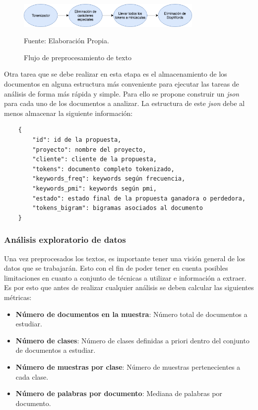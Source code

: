     \begin{figure}[H]
    \centering
    \includegraphics[width=0.8\textwidth]{figures/Normalizador_Textos.png}
    \caption{\label{fig:normalizador} Flujo de preprocesamiento de texto} Fuente: Elaboración Propia.
    \end{figure}
    
    Otra tarea que se debe realizar en esta etapa es el almacenamiento de los documentos en alguna estructura más conveniente para ejecutar las tareas de análisis de forma más rápida y simple. Para ello se propone construir un \textit{json} para cada uno de los documentos a analizar. La estructura de este \textit{json} debe al menos almacenar la siguiente información:
    
    \begin{lstlisting}
    {
        "id": id de la propuesta,
        "proyecto": nombre del proyecto,
        "cliente": cliente de la propuesta,
        "tokens": documento completo tokenizado,
        "keywords_freq": keywords según frecuencia,
        "keywords_pmi": keywords según pmi,
        "estado": estado final de la propuesta ganadora o perdedora,
        "tokens_bigram": bigramas asociados al documento
    }
    \end{lstlisting}
    

\subsubsection{Análisis exploratorio de datos}
    Una vez preprocesados los textos, es importante tener una visión general de los datos que se trabajarán. Esto con el fin de poder tener en cuenta posibles limitaciones en cuanto a conjunto de técnicas a utilizar e información a extraer. Es por esto que antes de realizar cualquier análisis se deben calcular las siguientes métricas:
    
    \begin{itemize}
        \item \textbf{Número de documentos en la muestra}: Número total de documentos a estudiar.
        \item \textbf{Número de clases}: Número de clases definidas a priori dentro del conjunto de documentos a estudiar.
        \item \textbf{Número de muestras por clase}: Número de muestras pertenecientes a cada clase.
        \item \textbf{Número de palabras por documento}: Mediana de palabras por documento.
    \end{itemize}
    
